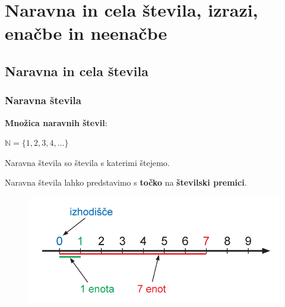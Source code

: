 \section{Naravna in cela števila, izrazi, enačbe in neenačbe}

\begin{frame}
    \sectionpage
\end{frame}

\begin{frame}
\end{frame}
        
    \subsection{Naravna in cela števila}

        \begin{frame}
            \frametitle{Naravna števila}

            \textbf{Množica naravnih števil}: 
                \begin{alertblock}{}
                    \centering\boldmath
                    $\mathbb{N}=\{1, 2, 3, 4, \ldots\}$
                \end{alertblock}

            Naravna števila so števila s katerimi štejemo.
            
            \medskip
            Naravna števila lahko predstavimo s \textbf{točko} na \textbf{številski premici}.
                \begin{figure}
                    \includegraphics[scale=0.65]{Slike in skice/Stevilska_premica.png}
                \end{figure}
        \end{frame}

